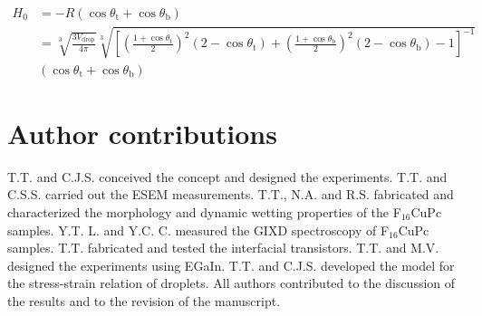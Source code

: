  \begin{equation}
 \label{eq:small-9}
 \begin{aligned}
 H_{0} &= -R(\cos \theta_{\mathrm{t}} + \cos \theta_{\mathrm{b}})  \\
 &= \sqrt[3]{\frac{3 V_{\mathrm{drop}}}{4 \pi}} \sqrt[3]{\left[ 
\left(\frac{1 + \cos \theta_{\mathrm{t}}}{2} \right)^{2} \left(2 - \cos \theta_{\mathrm{t}}\right) +
 \left(\frac{1 + \cos \theta_{\mathrm{b}}}{2} \right)^{2} \left(2 - \cos \theta_{\mathrm{b}}\right) -1 
\right]^{-1}}\\
&\left(\cos \theta_{\mathrm{t}} + \cos \theta_{\mathrm{b}}\right)
 \end{aligned}
\end{equation}



\section{Author contributions}
\label{sec:small-contrib}
T.T. and C.J.S. conceived the concept and designed the
experiments. T.T. and C.S.S. carried out the ESEM
measurements. T.T., N.A. and R.S. fabricated and characterized the
morphology and dynamic wetting properties of the F\(_{\text{16}}\)CuPc
samples. Y.T. L. and Y.C. C. measured the GIXD spectroscopy of
F\(_{\text{16}}\)CuPc samples. T.T. fabricated and tested the interfacial
transistors. T.T. and M.V. designed the experiments using
EGaIn. T.T. and C.J.S. developed the model for the stress-strain
relation of droplets.  All
authors contributed to the discussion of the results and to the
revision of the manuscript.



% 
























